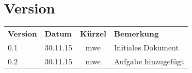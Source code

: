 \chapter*{Version}

\begin{tabular}{|l|l|c|p{11cm}|}
	\rowcolor{black} {\color{white}\textbf{Version}} & {\color{white}\textbf{Datum}} & {\color{white}\textbf{Kürzel}} & {\color{white}\textbf{Bemerkung}} \\
	0.1 & 30.11.15 & mwe & Initiales Dokument \\ \hline
	0.2 & 30.11.15 & mwe & Aufgabe hinzugefügt \\ \hline
\end{tabular}